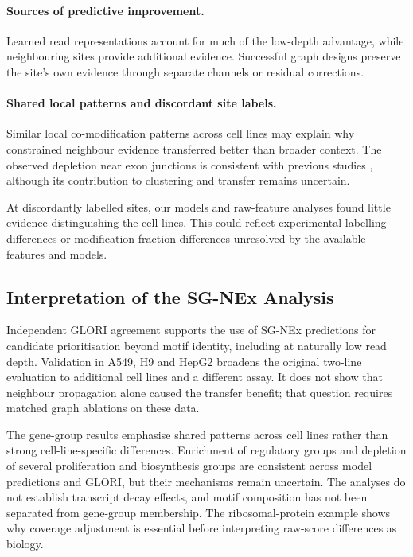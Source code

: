 \documentclass[11pt,a4paper]{article}
\begin{document}
\paragraph{Sources of predictive improvement.}
Learned read representations account for much of the
low-depth advantage, while neighbouring sites provide
additional evidence. Successful graph designs preserve
the site's own evidence through separate channels or
residual corrections.

\paragraph{Shared local patterns and discordant site labels.}
Similar local co-modification patterns across cell lines
may explain why constrained neighbour evidence transferred
better than broader context. The observed depletion near
exon junctions is consistent with previous studies
\citep{he2023,uzonyi2023}, although its contribution to
clustering and transfer remains uncertain.

At discordantly labelled sites, our models and raw-feature
analyses found little evidence distinguishing the cell
lines. This could reflect experimental labelling differences
or modification-fraction differences unresolved by the
available features and models.

\subsection{Interpretation of the SG-NEx Analysis}
Independent GLORI agreement supports the use of SG-NEx predictions for
candidate prioritisation beyond motif identity, including at naturally low
read depth. Validation in A549, H9 and HepG2 broadens the original two-line
evaluation to additional cell lines and a different assay. It does not show
that neighbour propagation alone caused the transfer benefit; that question
requires matched graph ablations on these data.

The gene-group results emphasise shared patterns across cell lines rather
than strong cell-line-specific differences. Enrichment of regulatory groups
and depletion of several proliferation and biosynthesis groups are
consistent across model predictions and GLORI, but their mechanisms remain
uncertain. The analyses do not establish transcript decay effects, and
motif composition has not been separated from gene-group membership.
The ribosomal-protein example shows why coverage adjustment is essential
before interpreting raw-score differences as biology.
\end{document}
